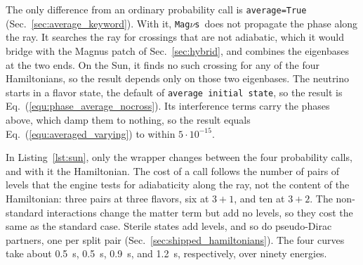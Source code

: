 \documentclass[final,5p,times,twocolumn,sort,compress]{elsarticle}
\makeatletter
\newcommand{\eq}{Eq.}
\DeclareRobustCommand{\_}{%
  \ifmmode\nfss@text{\textunderscore}\else\textunderscore\allowbreak\fi}
\newcommand{\equ}[1]{\eq~(\ref{equ:#1})}
\newcommand{\magnus}{{\tt Mag}\ensuremath{\nu}{\tt s}}
\makeatother
\begin{document}
The only difference from an ordinary probability call is {\tt average=True} (Sec.~\ref{sec:average_keyword}). With it, \magnus\ does not propagate the phase along the ray. It searches the ray for crossings that are not adiabatic, which it would bridge with the Magnus patch of Sec.~\ref{sec:hybrid}, and combines the eigenbases at the two ends. On the Sun, it finds no such crossing for any of the four Hamiltonians, so the result depends only on those two eigenbases. The neutrino starts in a flavor state, the default of {\tt average\_initial\_state}, so the result is \equ{phase_average_nocross}. Its interference terms carry the phases above, which damp them to nothing, so the result equals \equ{averaged_varying} to within $5 \cdot 10^{-15}$.

In Listing~\ref{lst:sun}, only the wrapper changes between the four probability calls, and with it the Hamiltonian. The cost of a call follows the number of pairs of levels that the engine tests for adiabaticity along the ray, not the content of the Hamiltonian: three pairs at three flavors, six at $3+1$, and ten at $3+2$. The non-standard interactions change the matter term but add no levels, so they cost the same as the standard case. Sterile states add levels, and so do pseudo-Dirac partners, one per split pair (Sec.~\ref{sec:shipped_hamiltonians}). The four curves take about 0.5~s, 0.5~s, 0.9~s, and 1.2~s, respectively, over ninety energies.
\end{document}
